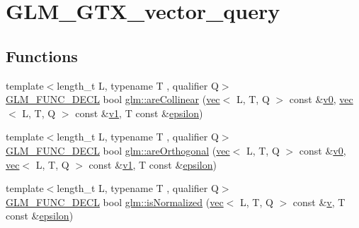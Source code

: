 \hypertarget{group__gtx__vector__query}{}\section{G\+L\+M\+\_\+\+G\+T\+X\+\_\+vector\+\_\+query}
\label{group__gtx__vector__query}
\subsection*{Functions}
\begin{DoxyCompactItemize}
\item 
{\footnotesize template$<$length\+\_\+t L, typename T , qualifier Q$>$ }\\\mbox{\hyperlink{setup_8hpp_ab2d052de21a70539923e9bcbf6e83a51}{G\+L\+M\+\_\+\+F\+U\+N\+C\+\_\+\+D\+E\+CL}} bool \mbox{\hyperlink{group__gtx__vector__query_ga13da4a787a2ff70e95d561fb19ff91b4}{glm\+::are\+Collinear}} (\mbox{\hyperlink{structglm_1_1vec}{vec}}$<$ L, T, Q $>$ const \&\mbox{\hyperlink{_s_d_l__opengl__glext_8h_a7062a23d1d434121d4a88f530703d06a}{v0}}, \mbox{\hyperlink{structglm_1_1vec}{vec}}$<$ L, T, Q $>$ const \&\mbox{\hyperlink{_s_d_l__opengl__glext_8h_a435c176a02c061b43e19bdf7c86cceae}{v1}}, T const \&\mbox{\hyperlink{group__gtc__constants_ga2a1e57fc5592b69cfae84174cbfc9429}{epsilon}})
\item 
{\footnotesize template$<$length\+\_\+t L, typename T , qualifier Q$>$ }\\\mbox{\hyperlink{setup_8hpp_ab2d052de21a70539923e9bcbf6e83a51}{G\+L\+M\+\_\+\+F\+U\+N\+C\+\_\+\+D\+E\+CL}} bool \mbox{\hyperlink{group__gtx__vector__query_gac7b95b3f798e3c293262b2bdaad47c57}{glm\+::are\+Orthogonal}} (\mbox{\hyperlink{structglm_1_1vec}{vec}}$<$ L, T, Q $>$ const \&\mbox{\hyperlink{_s_d_l__opengl__glext_8h_a7062a23d1d434121d4a88f530703d06a}{v0}}, \mbox{\hyperlink{structglm_1_1vec}{vec}}$<$ L, T, Q $>$ const \&\mbox{\hyperlink{_s_d_l__opengl__glext_8h_a435c176a02c061b43e19bdf7c86cceae}{v1}}, T const \&\mbox{\hyperlink{group__gtc__constants_ga2a1e57fc5592b69cfae84174cbfc9429}{epsilon}})
\item 
{\footnotesize template$<$length\+\_\+t L, typename T , qualifier Q$>$ }\\\mbox{\hyperlink{setup_8hpp_ab2d052de21a70539923e9bcbf6e83a51}{G\+L\+M\+\_\+\+F\+U\+N\+C\+\_\+\+D\+E\+CL}} bool \mbox{\hyperlink{group__gtx__vector__query_gac3c974f459fd75453134fad7ae89a39e}{glm\+::is\+Normalized}} (\mbox{\hyperlink{structglm_1_1vec}{vec}}$<$ L, T, Q $>$ const \&\mbox{\hyperlink{_s_d_l__opengl_8h_a10a82eabcb59d2fcd74acee063775f90}{v}}, T const \&\mbox{\hyperlink{group__gtc__constants_ga2a1e57fc5592b69cfae84174cbfc9429}{epsilon}})

\end{DoxyCompactItemize}
